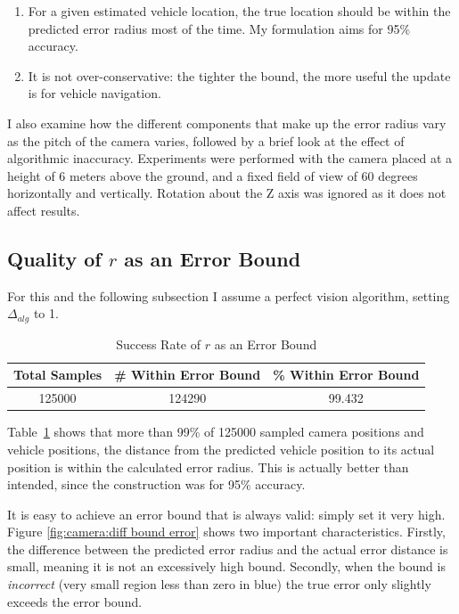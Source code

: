 \documentclass[a4paper,12pt,twoside,openright]{report}
\begin{document}
\begin{enumerate}
    \item For a given estimated vehicle location, the true location should be within the predicted
          error radius most of the time. My formulation aims for 95\% accuracy.
    \item It is not over-conservative: the tighter the bound, the more useful the update is
          for vehicle navigation.
\end{enumerate}

I also examine how the different components that make up the error radius vary
as the pitch of the camera varies, followed by a brief look at the
effect of algorithmic inaccuracy. Experiments were performed
with the camera placed at a height of 6 meters above the ground, and a fixed
field of view of 60 degrees horizontally and vertically. Rotation about the Z axis
was ignored as it does not affect results.

\subsection{Quality of $r$ as an Error Bound}

For this and the following subsection I assume a perfect vision algorithm,
setting $\Delta_{alg}$ to 1.

\begin{table}[htb]
    \centering
    \caption[$r$ as an Error Bound]{Success Rate of $r$ as an Error Bound}
    \label{tab:camera:bound accuracy}
    \begin{tabular}{@{}ccc@{}}
        \toprule
        Total Samples & \# Within Error Bound & \% Within Error Bound \\ \midrule
        125000              & 124290                  & 99.432 
    \end{tabular}
\end{table}

Table~\ref{tab:camera:bound accuracy} shows that more than 99\% of 125000 sampled camera positions
and vehicle positions, the distance from the predicted vehicle position to 
its actual position is within the calculated error radius. This
is actually better than intended, since the construction was for 95\% accuracy.

It is easy to achieve an error bound that is always valid: simply set it very high.
Figure \ref{fig:camera:diff bound error} shows two important characteristics. Firstly, the difference between
the predicted error radius and the actual error distance is small, meaning
it is not an excessively high bound. Secondly, when the bound is \textit{incorrect} (very small region less than zero in blue)
the true error only slightly exceeds the error bound.
\end{document}
